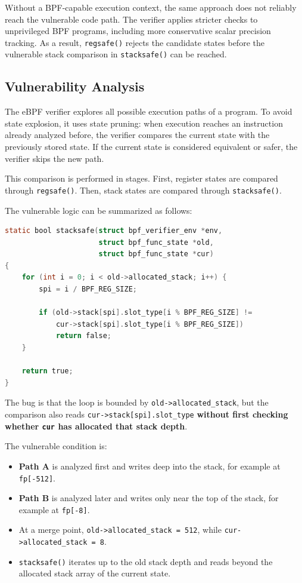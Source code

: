 \documentclass[../main.tex]{subfiles}
\begin{document}
Without a BPF-capable execution context, the same approach does not reliably reach the vulnerable code path. The verifier applies stricter checks to unprivileged BPF programs, including more conservative scalar precision tracking. As a result, \texttt{regsafe()} rejects the candidate states before the vulnerable stack comparison in \texttt{stacksafe()} can be reached.

\subsection{Vulnerability Analysis}

The eBPF verifier explores all possible execution paths of a program. To avoid state explosion, it uses state pruning: when execution reaches an instruction already analyzed before, the verifier compares the current state with the previously stored state. If the current state is considered equivalent or safer, the verifier skips the new path.

This comparison is performed in stages. First, register states are compared through \texttt{regsafe()}. Then, stack states are compared through \texttt{stacksafe()}.

The vulnerable logic can be summarized as follows:

\begin{lstlisting}[language=C, caption={Simplified vulnerable stacksafe logic.}]
static bool stacksafe(struct bpf_verifier_env *env,
                      struct bpf_func_state *old,
                      struct bpf_func_state *cur)
{
    for (int i = 0; i < old->allocated_stack; i++) {
        spi = i / BPF_REG_SIZE;

        if (old->stack[spi].slot_type[i % BPF_REG_SIZE] !=
            cur->stack[spi].slot_type[i % BPF_REG_SIZE])
            return false;
    }

    return true;
}
\end{lstlisting}

The bug is that the loop is bounded by \texttt{old->allocated\_stack}, but the comparison also reads \texttt{cur->stack[spi].slot\_type} \textbf{without first checking whether \texttt{cur} has allocated that stack depth}.

The vulnerable condition is:

\begin{itemize}
    \item \textbf{Path A} is analyzed first and writes deep into the stack, for example at \texttt{fp[-512]}.
    \item \textbf{Path B} is analyzed later and writes only near the top of the stack, for example at \texttt{fp[-8]}.
    \item At a merge point, \texttt{old->allocated\_stack = 512}, while \texttt{cur->allocated\_stack = 8}.
    \item \texttt{stacksafe()} iterates up to the old stack depth and reads beyond the allocated stack array of the current state.
\end{itemize}
\end{document}
